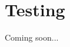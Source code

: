 \section{Testing}
Coming soon...
\begin{comment}
\section{Over-Approximation Theory Refinement}
\label{sec:soundness}

From now on, We focus on a \emph{polynomial inequality} such that 
$I_i$ and $\psi_j(x_1,\cdots,x_n)$ are an open interval $(a_i,b_i)$ and 
an atomic polynomial inequaltiy (API) $f_j > 0$, respectively. 
We denote $\mathbb{S}(f_j) = \{x \in \Real^n \mid f_j > 0 ~\text{holds}\}$.

For ICP, it is folklore that, for polynomial inequality 
$\exists x_1 \in (a_1,b_1) \cdots x_n \in (a_n,b_n) . \wedge_{i} f_i > 0$, 
\begin{itemize}
\item if $\exists x_1 \in (a_1,b_1) \cdots x_n \in (a_n,b_n) . \wedge_{i} f_i > 0$ is SAT, 
ICP eventually detects it, and 
\item if $\exists x_1 \in [a_1,b_1] \cdots x_n \in [a_n,b_n] . \wedge_{i} f_i \geq 0$ is UNSAT, 
ICP eventually detects it, 
\end{itemize}
under the assumptions of {\em fair} decomposition and bounded intervals $(a_i,b_i)$. 
We will prepare terminology and briefly review this fact. 

\suppress{
\begin{definition} \label{def:poly}
A polynomial inequality is a bounded quantification 
$\exists x_1 \in I_1 \cdots x_n \in I_n. \psi(x_1,\cdots,x_n)$ 
such that 
\begin{itemize}
\item each $I_i$ is an open interval $x_i \in (a_i,b_i)$, and 
\item $\psi(x_1,\cdots,x_n)$ is a conjunction of $f_j > 0$ 
where $f_j$ is a polynomial over $\{x_1, \cdots, x_n\}$. 
\end{itemize}
$f_i > 0$ is called an atomic polynomial inequality (API). 
We denote $\mathbb{S}(F) = \{x \in \Real^n \mid F ~\text{holds}\}$.
\end{definition}

\begin{example} \label{examp:poly_ieq}
$\exists x \in (-1,3)~y \in (2,4) . (x^3y - y^4 > 0) \wedge (y^3 -xy >0)$
is an example of a polynomial inequality with 2 variables and 2 APIs. 
\end{example}
}


\end{comment}
